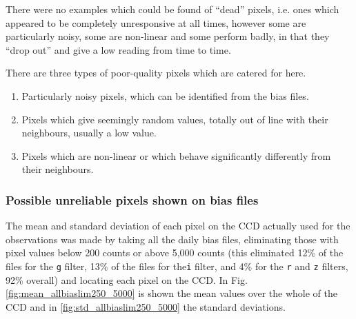 There were no examples which could be found of ``dead'' pixels, i.e. ones which appeared to be completely
unresponsive at all times, however some are particularly noisy, some are
non-linear and some perform badly, in that they ``drop out'' and give a low
reading from time to time.

There are three types of poor-quality pixels which are catered for here.

\begin{enumerate}
\item Particularly noisy pixels, which can be identified from the bias files.
\item Pixels which give seemingly random values, totally out of line with their
neighbours, usually a low value.
\item Pixels which are non-linear or which behave significantly differently from
their neighbours.
\end{enumerate}

\subsubsection{Possible unreliable pixels shown on bias files}
\protect\label{section:badpixbias}

The mean and standard deviation of each pixel on the CCD actually used for the
observations was made by taking all the daily bias files, eliminating those with
pixel values below 200 counts or above 5,000 counts (this eliminated 12\% of the files for the \texttt{g} filter, 13\% of the files for the\texttt{i} filter,
and 4\% for the \texttt{r} and \texttt{z} filters, 92\% overall) and locating
each pixel on the CCD.
In Fig. \ref{fig:mean_allbiaslim250_5000} is shown the mean values over the whole of the
CCD and in \ref{fig:std_allbiaslim250_5000} the standard deviations.


